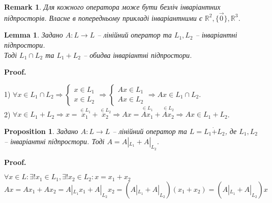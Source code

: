 \documentclass[a4paper, 10pt]{article}
\makeatletter
\theoremstyle{theoremdd}
\newtheorem{proposition}[theorem]{Proposition}
\newtheorem{remark}[theorem]{Remark}
\newtheorem{lemma}[theorem]{Lemma}
\renewenvironment{proof}[1][Proof.\\]{\par
\pushQED{\hfill \qed}%
\normalfont \topsep6\p@\@plus6\p@\relax
\trivlist
\item\relax
{\bfseries
#1\@addpunct{.}}\hspace\labelsep\ignorespaces
}{%
\popQED\endtrivlist\@endpefalse
}
\makeatother
\begin{document}
\begin{remark}
Для кожного оператора може бути безліч інваріантних підпросторів. Власне в попередньому прикладі інваріантними є $\mathbb{R}^2, \{\vec{0}\}, \mathbb{R}^3$.
\end{remark}
\fi

\begin{lemma}
Задано $A \colon L \to L$ -- лінійний оператор та $L_1, L_2$ -- інваріантні підпростори.\\
Тоді $L_1 \cap L_2$ та $L_1 + L_2$ -- обидва інваріантні підпростори.
\end{lemma}

\begin{proof}
1) $\forall x \in L_1 \cap L_2 \Rightarrow \begin{cases} x \in L_1 \\ x \in L_2 \end{cases} \Rightarrow \begin{cases} Ax \in L_1 \\ Ax \in L_2 \end{cases} \Rightarrow Ax \in L_1 \cap L_2$.
\bigskip \\
2) $\forall x \in L_1 + L_2 \Rightarrow x = \overset{\in L_1}{x_1} + \overset{\in L_2}{x_2} \Rightarrow Ax = \overset{\in L_1}{A x_1} + \overset{\in L_2}{A x_2} \Rightarrow Ax \in L_1+L_2$.
\end{proof}

\begin{proposition}
Задано $A \colon L \to L$ -- лінійний оператор та $L = L_1 \dot{+} L_2$, де $L_1,L_2$ -- інваріантні підпростори. Тоді $A = A|_{L_1} + A|_{L_2}$.
\end{proposition}

\begin{proof}
$\forall x \in L: \exists! x_1 \in L_1, \exists! x_2 \in L_2: x = x_1 + x_2$\\
$Ax = Ax_1 + Ax_2 = A|_{L_1}x_1 + A|_{L_2}x_2 = (A|_{L_1}+A|_{L_2})(x_1 + x_2) = (A|_{L_1}+A|_{L_2})x$
\end{proof}
\end{document}
